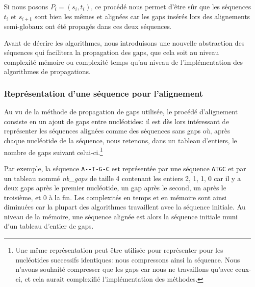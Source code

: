 Si nous posons $P_{i} = (s_{i}, t_{i})$, ce procédé nous permet d'être sûr que
les séquences $t_{i}$ et $s_{i + 1}$ sont bien les mêmes et alignées car les
gaps insérés lors des alignements semi-globaux ont été propagés dans ces deux
séquences.

Avant de décrire les algorithmes, nous introduisons une nouvelle abstraction des
séquences qui facilitera la propagation des gaps, que cela soit au niveau
complexité mémoire ou complexité temps qu'au niveau de l'implémentation des
algorithmes de propagations.

\subsubsection{Représentation d'une séquence pour l'alignement}
\label{subsubsection:repr_sequence_alignment}

Au vu de la méthode de propagation de gaps utilisée, le procédé d'alignement
consiste en un ajout de gaps entre nucléotides: il est dès lors intéressant de
représenter les séquences alignées comme des séquences sans gaps où, après
chaque nucléotide de la séquence, nous retenons, dans un tableau d'entiers, le
nombre de gaps suivant celui-ci.\footnote{Une même représentation peut être
	utilisée pour représenter pour les nucléotides successifs identiques: nous
	compressons ainsi la séquence. Nous n'avons souhaité compresser que les gaps
	car nous ne travaillons qu'avec ceux-ci, et cela aurait complexifié
l'implémentation des méthodes.}

Par exemple, la séquence \verb|A--T-G-C| est représentée par une séquence
\verb|ATGC| et par un tableau nommé \emph{nb\_gaps} de taille 4
contenant les entiers {2, 1, 1, 0} car il y a deux gaps après le premier
nucléotide, un gap après le second, un après le troisième, et 0 à la fin. Les
complexités en temps et en mémoire sont ainsi diminuées car la plupart des
algorithmes travaillent avec la séquence initiale.
Au niveau de la mémoire, une séquence alignée est alors la
séquence initiale muni d'un tableau d'entier de gaps.

